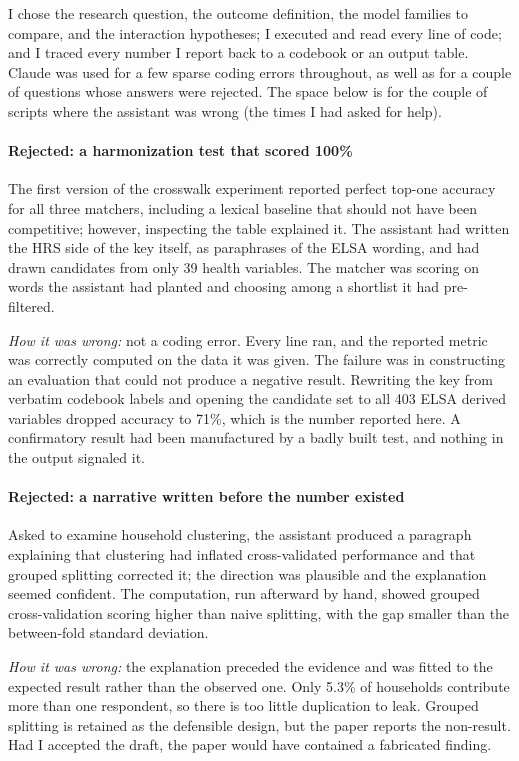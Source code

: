 \documentclass[9pt,twoside]{pnas-new}
\begin{document}
I chose the research question, the outcome
definition, the model families to compare, and the interaction hypotheses; I
executed and read every line of code; and I traced every number I report back to
a codebook or an output table. Claude was used for a few sparse coding errors throughout, as well as for a couple of questions whose answers were rejected. The space below is for the couple of
scripts where the assistant was wrong (the times I had asked for help).

\paragraph{Rejected: a harmonization test that scored 100\%} The first version
of the crosswalk experiment reported perfect top-one accuracy for all three
matchers, including a lexical baseline that should not have been competitive; however, inspecting the table explained it. The assistant had written the
HRS side of the key itself, as paraphrases of the ELSA wording, and had drawn
candidates from only 39 health variables. The matcher was scoring on words the
assistant had planted and choosing among a shortlist it had pre-filtered.

\emph{How it was wrong:} not a coding error. Every line ran, and the reported
metric was correctly computed on the data it was given. The failure was in
constructing an evaluation that could not produce a negative result. Rewriting
the key from verbatim codebook labels and opening the candidate set to all 403
ELSA derived variables dropped accuracy to 71\%, which is the number reported
here. A confirmatory result had been manufactured by a badly built test, and
nothing in the output signaled it.

\paragraph{Rejected: a narrative written before the number existed} Asked to
examine household clustering, the assistant produced a paragraph explaining that
clustering had inflated cross-validated performance and that grouped splitting
corrected it; the direction was plausible and the explanation seemed confident. The
computation, run afterward by hand, showed grouped cross-validation scoring
higher than naive splitting, with the gap smaller than the between-fold
standard deviation.

\emph{How it was wrong:} the explanation preceded the evidence and was fitted to
the expected result rather than the observed one. Only 5.3\% of households
contribute more than one respondent, so there is too little duplication to leak.
Grouped splitting is retained as the defensible design, but the paper reports
the non-result. Had I accepted the draft, the paper would have contained a
fabricated finding.
\end{document}
